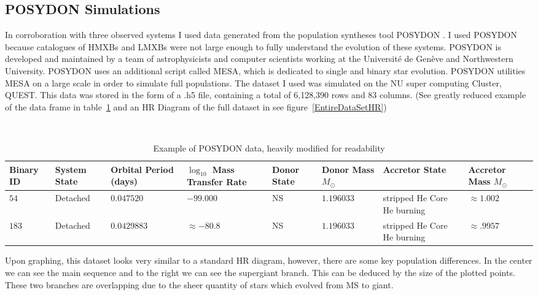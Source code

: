 \documentclass[12pt, a4paper]{article}
\begin{document}
    \subsection{POSYDON Simulations}
        In corroboration with three observed systems I used data generated from the population syntheses tool POSYDON \parencite{Fragos_2023}. I used POSYDON because catalogues of HMXBs and LMXBs were not large enough to fully understand the evolution of these systems. POSYDON is developed and maintained by a team of astrophysicists and computer scientists working at the Université de Genève and Northwestern University. POSYDON uses an additional script called MESA, which is dedicated to single and binary star evolution. POSYDON utilities MESA on a large scale in order to simulate full populations. The dataset I used was simulated on the NU super computing Cluster, QUEST. This data was stored in the form of a .h5 file, containing a total of 6,128,390 rows and 83 columns. (See greatly reduced example of the data frame in table~\ref{POSYDONDataExample} and an HR Diagram of the full dataset in see figure~\ref{EntireDataSetHR})

        \begin{table}[H]
            \centering\
            \footnotesize
            \begin{tabularx}{\textwidth}{||X | X | X | X | X | X | X | X ||}
                \hline 
                \textbf{Binary ID} & 
                \textbf{System State} & 
                \textbf{Orbital Period (days)} & 
                \boldmath$\log_{10}$ \textbf{Mass Transfer Rate} & 
                \textbf{Donor State} & 
                \textbf{Donor Mass} $M_\odot$ & 
                \textbf{Accretor State} & 
                \textbf{Accretor Mass} $M_\odot$
                \\ \hline \hline
                $54$ & Detached & $0.047520$ & $-99.000$ & NS & $1.196033$ & stripped He Core He burning & $\approx 1.002$ \\
                \hline
                $183$ & Detached & $0.0429883$ & $ \approx -80.8$ & NS & $1.196033$ & stripped He Core He burning & $\approx .9957$ \\
                \hline
            \end{tabularx}
            \caption{Example of POSYDON data, heavily modified for readability}
            \label{POSYDONDataExample}
        \end{table}
        
        Upon graphing, this dataset looks very similar to a standard HR diagram, however, there are some key population differences. In the center we can see the main sequence and to the right we can see the supergiant branch. This can be deduced by the size of the plotted points. These two branches are overlapping due to the sheer quantity of stars which evolved from MS to giant. 
\end{document}

